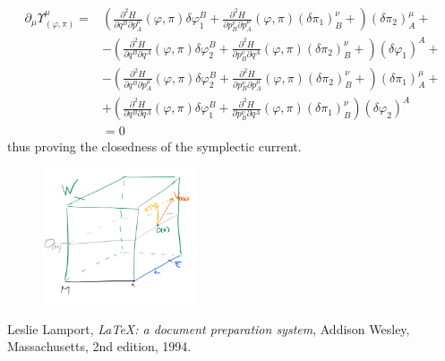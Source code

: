 \documentclass[a4paper,12pt]{scrartcl}  %
\begin{document}
\begin{align*}
	\partial_\mu \Upsilon_{(\varphi,\pi)}^\mu  =&	 
	\left(
		\frac{\partial^2 H}{\partial q^B \partial p^\mu_A} (\varphi,\pi) \delta \varphi_1^B +
		\frac{\partial^2 H}{\partial p^\nu_B \partial p^\mu_A} (\varphi,\pi) ( \delta \pi_1)^\nu_B +
	\right) ( \delta \pi_2)^\mu_A +\\
	&-\left(
		\frac{\partial^2 H}{\partial q^B \partial q^A} (\varphi,\pi) \delta \varphi_2^B +
		\frac{\partial^2 H}{\partial p^\nu_B \partial q^A} (\varphi,\pi) ( \delta \pi_2)^\nu_B +
	\right) ( \delta \varphi_1)^A +\\
	&-\left(
		\frac{\partial^2 H}{\partial q^B \partial p^\mu_A} (\varphi,\pi) \delta \varphi_2^B +
		\frac{\partial^2 H}{\partial p^\nu_B \partial p^\mu_A} (\varphi,\pi) ( \delta \pi_2)^\nu_B +
	\right) ( \delta \pi_1)^\mu_A +\\
	&+\left(
		\frac{\partial^2 H}{\partial q^B \partial q^A} (\varphi,\pi) \delta \varphi_1^B +
		\frac{\partial^2 H}{\partial p^\nu_B \partial q^A} (\varphi,\pi) ( \delta \pi_1)^\nu_B
	\right) ( \delta \varphi_2)^A \\
	&=0
\end{align*}
thus proving the closedness of the symplectic current.

\begin{figure}
\centering
\includegraphics[width=0.40\textwidth]{Pictures/sigma.png}
\end{figure}








\begin{thebibliography}{9}

  Leslie Lamport,
  \emph{\LaTeX: a document preparation system},
  Addison Wesley, Massachusetts,
  2nd edition,
  1994.

\end{thebibliography}
\end{document}
